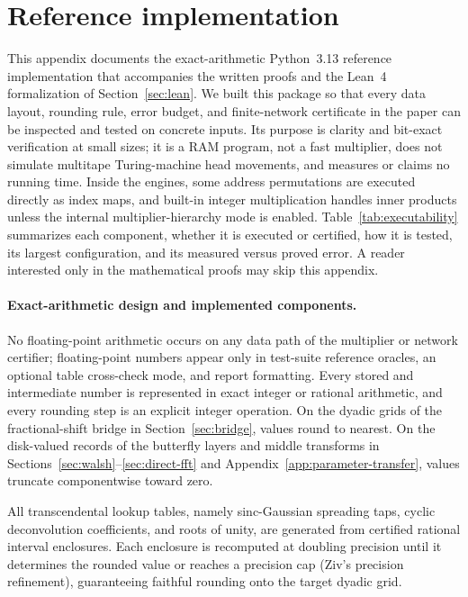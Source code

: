 \section{Reference implementation}\label{app:impl}\label{sec:impl}

This appendix documents the exact-arithmetic Python~3.13 reference implementation that accompanies the written proofs and the Lean~4 formalization of Section~\ref{sec:lean}. We built this package so that every data layout, rounding rule, error budget, and finite-network certificate in the paper can be inspected and tested on concrete inputs. Its purpose is clarity and bit-exact verification at small sizes; it is a RAM program, not a fast multiplier, does not simulate multitape Turing-machine head movements, and measures or claims no running time. Inside the engines, some address permutations are executed directly as index maps, and built-in integer multiplication handles inner products unless the internal multiplier-hierarchy mode is enabled. Table~\ref{tab:executability} summarizes each component, whether it is executed or certified, how it is tested, its largest configuration, and its measured versus proved error. A reader interested only in the mathematical proofs may skip this appendix.

\paragraph{Exact-arithmetic design and implemented components.}
No floating-point arithmetic occurs on any data path of the multiplier or network certifier; floating-point numbers appear only in test-suite reference oracles, an optional table cross-check mode, and report formatting. Every stored and intermediate number is represented in exact integer or rational arithmetic, and every rounding step is an explicit integer operation. On the dyadic grids of the fractional-shift bridge in Section~\ref{sec:bridge}, values round to nearest. On the disk-valued records of the butterfly layers and middle transforms in Sections~\ref{sec:walsh}--\ref{sec:direct-fft} and Appendix~\ref{app:parameter-transfer}, values truncate componentwise toward zero.

All transcendental lookup tables, namely sinc-Gaussian spreading taps, cyclic deconvolution coefficients, and roots of unity, are generated from certified rational interval enclosures. Each enclosure is recomputed at doubling precision until it determines the rounded value or reaches a precision cap (Ziv's precision refinement), guaranteeing faithful rounding onto the target dyadic grid.

